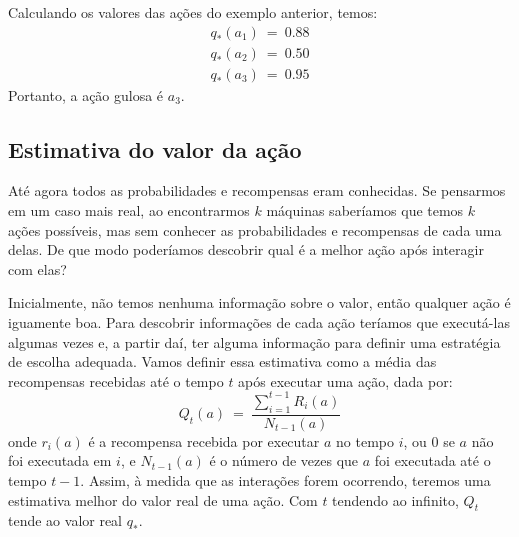 \documentclass{article}
\begin{document}
            Calculando os valores das ações do exemplo anterior, temos:
            \begin{equation*}
            \begin{split}
                q_*(a_1) \ = \ 0.88 \\
                q_*(a_2) \ = \ 0.50 \\
                q_*(a_3) \ = \ 0.95
            \end{split}
            \end{equation*}
            Portanto, a ação gulosa é $a_3$.
    
        \subsection{Estimativa do valor da ação}

            Até agora todos as probabilidades e recompensas eram conhecidas. Se pensarmos em um caso mais real, ao encontrarmos $k$ máquinas saberíamos que temos $k$ ações possíveis, mas sem conhecer as probabilidades e recompensas de cada uma delas. De que modo poderíamos descobrir qual é a melhor ação após interagir com elas?

            Inicialmente, não temos nenhuma informação sobre o valor, então qualquer ação é iguamente boa. Para descobrir informações de cada ação teríamos que executá-las algumas vezes e, a partir daí, ter alguma informação para definir uma estratégia de escolha adequada. Vamos definir essa estimativa como a média das recompensas recebidas até o tempo $t$ após executar uma ação, dada por:
            \begin{equation}
            \label{eq:estimativa-acao}
                Q_t(a) \ = \ \frac{\sum\limits_{i=1}^{t-1} R_i(a)}{N_{t-1}(a)}
            \end{equation}
            onde $r_i(a)$ é a recompensa recebida por executar $a$ no tempo $i$, ou $0$ se $a$ não foi executada em $i$, e $N_{t-1}(a)$ é o número de vezes que $a$ foi executada até o tempo $t-1$. Assim, à medida que as interações forem ocorrendo, teremos uma estimativa melhor do valor real de uma ação. Com $t$ tendendo ao infinito, $Q_t$ tende ao valor real $q_*$.
\end{document}
